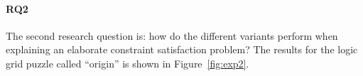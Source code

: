 

\paragraph{RQ2}
The second research question is: how do the different variants perform when explaining an elaborate constraint satisfaction problem? The results for the logic grid puzzle called ``origin'' is shown in Figure~\ref{fig:exp2}.

